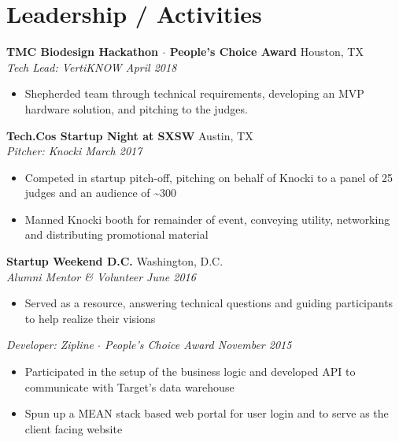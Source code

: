 \documentclass[10pt]{article}
\begin{document}
\section*{Leadership / Activities}
\textbf{TMC Biodesign Hackathon $\cdot$ People's Choice Award} \hfill Houston, TX\\
\textit{Tech Lead: VertiKNOW \hfill April 2018} \\
\vspace{-1.1em}
\begin{itemize}
  \item Shepherded team through technical requirements, developing an MVP hardware solution, and pitching to the judges.
\end{itemize}
\textbf{Tech.Co\textquotesingle{}s Startup Night at SXSW} \hfill Austin, TX\\
\textit{Pitcher: Knocki \hfill March 2017} \\
\vspace{-1.1em}
\begin{itemize}
  \item Competed in startup pitch-off, pitching on behalf of Knocki to a panel of 25 judges and an audience of {\textasciitilde{}}300
  \item Manned Knocki booth for remainder of event, conveying utility, networking and distributing promotional material
\end{itemize}
\textbf{Startup Weekend D.C.} \hfill Washington, D.C. \\
\textit{Alumni Mentor \& Volunteer \hfill June 2016} \\
\vspace{-1.1em}
\begin{itemize}
  \item Served as a resource, answering technical questions and guiding participants to help realize their visions
\end{itemize}
\textit{Developer: Zipline $\cdot$ People's Choice Award \hfill November 2015} \\
\vspace{-1.1em}
\begin{itemize}
  \item Participated in the setup of the business logic and developed API to communicate with Target's data warehouse
  \item Spun up a MEAN stack based web portal for user login and to serve as the client facing website
\end{itemize}
\end{document}
